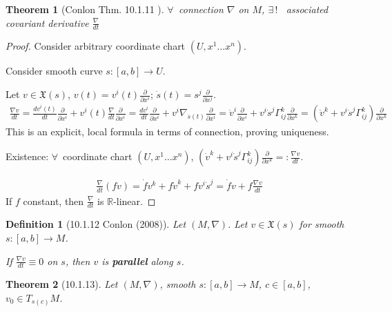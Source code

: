 \documentclass[10pt]{amsart}
\newtheorem{theorem}{Theorem}
\newtheorem{definition}{Definition}
\begin{document}
\begin{multicols*}{2}
\begin{theorem}[Conlon Thm. 10.1.11\cite{Conl2008} ]
	$\forall \, $ connection $\nabla$ on $M$, $\exists \, !$ \, associated covariant derivative $\frac{ \nabla }{dt}$
\end{theorem}

\begin{proof}
	Consider arbitrary coordinate chart $(U,x^1 \dots x^n)$.  
	
	Consider smooth curve $s:[a,b]\to U$.  
	
	Let $v\in \mathfrak{X}(s)$, $v(t) = v^i(t) \frac{ \partial }{ \partial x^i}$; $\dot{s}(t) = s^j \frac{ \partial }{ \partial x^j}$.  
	\[
	\begin{gathered}
	\frac{ \nabla v}{ dt} = \frac{dv^i(t) }{dt}\frac{ \partial }{ \partial x^i} + v^i(t) \frac{ \nabla}{dt} \frac{ \partial }{ \partial x^i} = \frac{ d v^i }{dt}	\frac{ \partial }{ \partial x^i} + v^i \nabla_{ \dot{s}(t) } \frac{ \partial }{ \partial x^i } = \dot{v}^i \frac{ \partial }{ \partial x^i } + v^i\dot{s}^j \Gamma^k_{ij} \frac{ \partial }{ \partial x^k} = \left( \dot{v}^k + v^i \dot{s}^j \Gamma^k_{ij} \right)\frac{ \partial }{ \partial x^k} \end{gathered}
	\]
	This is an explicit, local formula in terms of connection, proving uniqueness.  
	
	Existence: $\forall \, $ coordinate chart $(U,x^1\dots x^n)$, $\left( \dot{v}^k + v^i \dot{s}^j \Gamma_{ij}^k \right) \frac{ \partial }{ \partial x^k } =: \frac{ \nabla v}{dt}$.  
	
	\[
	\begin{gathered}
	\frac{\nabla}{dt}(fv) = \dot{f}v^k + f\dot{v}^k + fv^i \dot{s}^j = \dot{f}v + f\frac{ \nabla v}{dt}
	\end{gathered}
	\]
If $f$ constant, then $\frac{\nabla}{dt}$ is $\mathbb{R}$-linear.  	

\end{proof}

\begin{definition}[10.1.12 Conlon (2008)\cite{Conl2008}]
	Let $(M,\nabla)$.  Let $v\in\mathfrak{X}(s)$ for smooth $s:[a,b] \to M$.  

If $\frac{\nabla v}{dt} \equiv 0$ on $s$, then $v$ is \textbf{parallel } along $s$.  
\end{definition}

\begin{theorem}[10.1.13] 
Let $(M,\nabla)$, smooth $s:[a,b]\to M$, $c\in [a,b]$, $v_0 \in T_{s(c)}M$.  


\end{theorem}
\end{multicols*}
\end{document}
